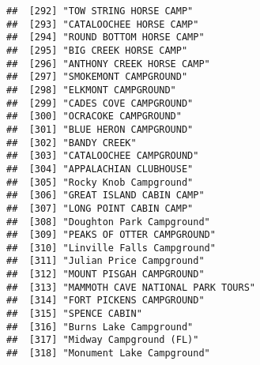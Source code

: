 \documentclass[
]{article}
\begin{document}
\begin{verbatim}
##  [292] "TOW STRING HORSE CAMP"                                                               
##  [293] "CATALOOCHEE HORSE CAMP"                                                              
##  [294] "ROUND BOTTOM HORSE CAMP"                                                             
##  [295] "BIG CREEK HORSE CAMP"                                                                
##  [296] "ANTHONY CREEK HORSE CAMP"                                                            
##  [297] "SMOKEMONT CAMPGROUND"                                                                
##  [298] "ELKMONT CAMPGROUND"                                                                  
##  [299] "CADES COVE CAMPGROUND"                                                               
##  [300] "OCRACOKE CAMPGROUND"                                                                 
##  [301] "BLUE HERON CAMPGROUND"                                                               
##  [302] "BANDY CREEK"                                                                         
##  [303] "CATALOOCHEE CAMPGROUND"                                                              
##  [304] "APPALACHIAN CLUBHOUSE"                                                               
##  [305] "Rocky Knob Campground"                                                               
##  [306] "GREAT ISLAND CABIN CAMP"                                                             
##  [307] "LONG POINT CABIN CAMP"                                                               
##  [308] "Doughton Park Campground"                                                            
##  [309] "PEAKS OF OTTER CAMPGROUND"                                                           
##  [310] "Linville Falls Campground"                                                           
##  [311] "Julian Price Campground"                                                             
##  [312] "MOUNT PISGAH CAMPGROUND"                                                             
##  [313] "MAMMOTH CAVE NATIONAL PARK TOURS"                                                    
##  [314] "FORT PICKENS CAMPGROUND"                                                             
##  [315] "SPENCE CABIN"                                                                        
##  [316] "Burns Lake Campground"                                                               
##  [317] "Midway Campground (FL)"                                                              
##  [318] "Monument Lake Campground"                                                            

\end{verbatim}
\end{document}
